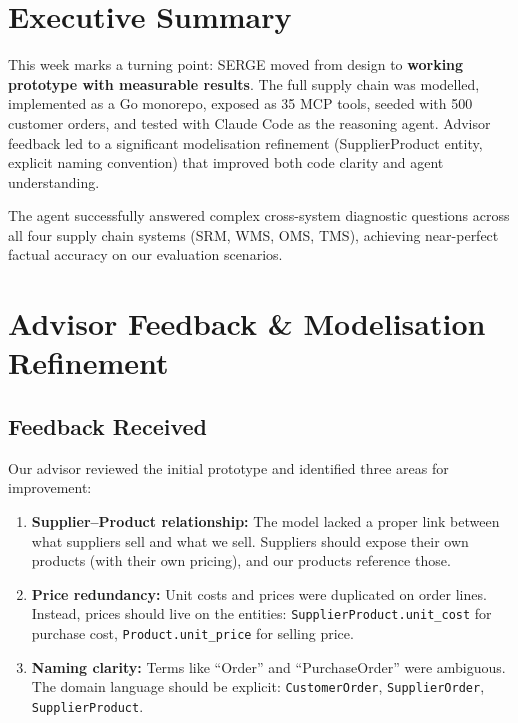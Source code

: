 \documentclass[11pt,a4paper]{article}
\begin{document}
\section{Executive Summary}

This week marks a turning point: SERGE moved from design to \textbf{working prototype with measurable results}. The full supply chain was modelled, implemented as a Go monorepo, exposed as 35 MCP tools, seeded with 500 customer orders, and tested with Claude Code as the reasoning agent. Advisor feedback led to a significant modelisation refinement (SupplierProduct entity, explicit naming convention) that improved both code clarity and agent understanding.

The agent successfully answered complex cross-system diagnostic questions across all four supply chain systems (SRM, WMS, OMS, TMS), achieving near-perfect factual accuracy on our evaluation scenarios.

\section{Advisor Feedback \& Modelisation Refinement}

\subsection{Feedback Received}

Our advisor reviewed the initial prototype and identified three areas for improvement:

\begin{enumerate}[itemsep=0.5em]
    \item \textbf{Supplier--Product relationship:} The model lacked a proper link between what suppliers sell and what we sell. Suppliers should expose their own products (with their own pricing), and our products reference those.
    \item \textbf{Price redundancy:} Unit costs and prices were duplicated on order lines. Instead, prices should live on the entities: \texttt{SupplierProduct.unit\_cost} for purchase cost, \texttt{Product.unit\_price} for selling price.
    \item \textbf{Naming clarity:} Terms like ``Order'' and ``PurchaseOrder'' were ambiguous. The domain language should be explicit: \texttt{CustomerOrder}, \texttt{SupplierOrder}, \texttt{SupplierProduct}.
\end{enumerate}
\end{document}
